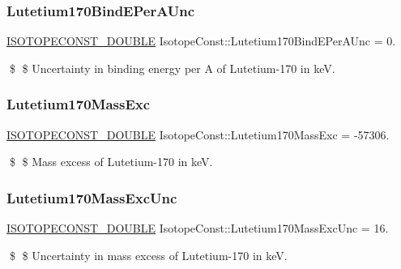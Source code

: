 \subsubsection{\texorpdfstring{Lutetium170\+Bind\+E\+Per\+A\+Unc}{Lutetium170BindEPerAUnc}}
{\footnotesize\ttfamily \mbox{\hyperlink{group___isotope_const-_macros_ga8f45a7272ce02c0b4c65c44636ed719a}{I\+S\+O\+T\+O\+P\+E\+C\+O\+N\+S\+T\+\_\+\+D\+O\+U\+B\+LE}} Isotope\+Const\+::\+Lutetium170\+Bind\+E\+Per\+A\+Unc = 0.}

\$ \$ Uncertainty in binding energy per A of Lutetium-\/170 in keV. \mbox{\label{group___isotope_const-_lutetium-_lu170_ga63809c7ec8308877b7159002ef6373f3}} 
\subsubsection{\texorpdfstring{Lutetium170\+Mass\+Exc}{Lutetium170MassExc}}
{\footnotesize\ttfamily \mbox{\hyperlink{group___isotope_const-_macros_ga8f45a7272ce02c0b4c65c44636ed719a}{I\+S\+O\+T\+O\+P\+E\+C\+O\+N\+S\+T\+\_\+\+D\+O\+U\+B\+LE}} Isotope\+Const\+::\+Lutetium170\+Mass\+Exc = -\/57306.}

\$ \$ Mass excess of Lutetium-\/170 in keV. \mbox{\label{group___isotope_const-_lutetium-_lu170_ga127bdc4be7e97a4326016bc0b29a520d}} 
\subsubsection{\texorpdfstring{Lutetium170\+Mass\+Exc\+Unc}{Lutetium170MassExcUnc}}
{\footnotesize\ttfamily \mbox{\hyperlink{group___isotope_const-_macros_ga8f45a7272ce02c0b4c65c44636ed719a}{I\+S\+O\+T\+O\+P\+E\+C\+O\+N\+S\+T\+\_\+\+D\+O\+U\+B\+LE}} Isotope\+Const\+::\+Lutetium170\+Mass\+Exc\+Unc = 16.}

\$ \$ Uncertainty in mass excess of Lutetium-\/170 in keV. \mbox{\label{group___isotope_const-_lutetium-_lu170_ga7bf4a36ed60ee85527351a21f7f646e4}} 
